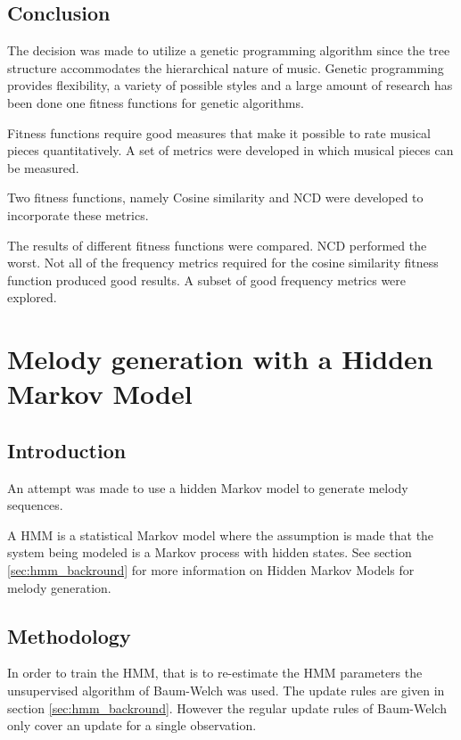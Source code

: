 \section{Conclusion}

The decision was made to utilize a genetic programming algorithm since the tree structure accommodates the hierarchical nature of music. Genetic programming provides flexibility, a variety of possible styles and a large amount of research has been done one fitness functions for genetic algorithms.

Fitness functions require good measures that make it possible to rate musical pieces quantitatively. A set of metrics were developed in which musical pieces can be measured.

Two fitness functions, namely Cosine similarity and \ac{NCD} were developed to incorporate these metrics.

The results of different fitness functions were compared. \ac{NCD} performed the worst. Not all of the frequency metrics required for the cosine similarity fitness function produced good results. A subset of good frequency metrics were explored.





\chapter{Melody generation with a Hidden Markov Model}
\section{Introduction}
An attempt was made to use a hidden Markov model to generate melody sequences.

A \ac{HMM} is a statistical Markov model where the assumption is made that the system being modeled  is a Markov process with hidden states. See section \ref{sec:hmm_backround} for more information on Hidden Markov Models for melody generation.

\section{Methodology}
In order to train the \ac{HMM}, that is to re-estimate the \ac{HMM} parameters the unsupervised algorithm of Baum-Welch was used. The update rules are given in section \ref{sec:hmm_backround}. However the regular update rules of Baum-Welch only cover an update for a single observation.

